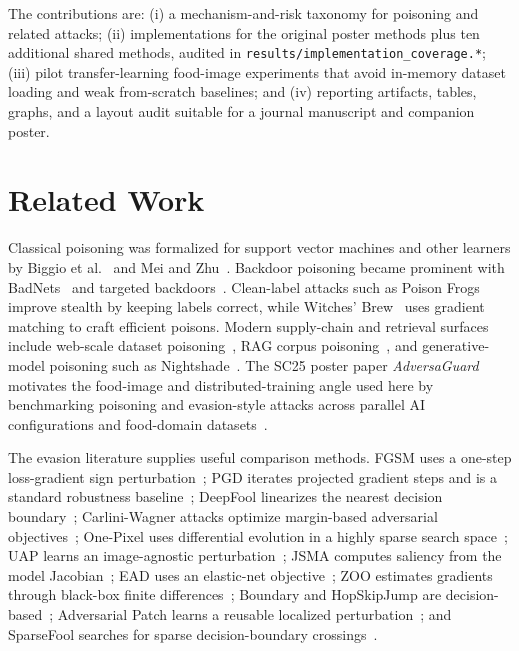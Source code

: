 ﻿\documentclass[6p,10pt,times]{ieeeaccess}
\begin{document}
The contributions are: (i) a mechanism-and-risk taxonomy for poisoning and related attacks; (ii) implementations for the original poster methods plus ten additional shared methods, audited in \texttt{results/implementation\_coverage.*}; (iii) pilot transfer-learning food-image experiments that avoid in-memory dataset loading and weak from-scratch baselines; and (iv) reporting artifacts, tables, graphs, and a layout audit suitable for a journal manuscript and companion poster.

\section{Related Work}

Classical poisoning was formalized for support vector machines and other learners by Biggio et al.~\cite{biggio2012} and Mei and Zhu~\cite{mei2015}. Backdoor poisoning became prominent with BadNets~\cite{badnets} and targeted backdoors~\cite{targetedbackdoor}. Clean-label attacks such as Poison Frogs~\cite{poisonfrogs} improve stealth by keeping labels correct, while Witches' Brew~\cite{witchesbrew} uses gradient matching to craft efficient poisons. Modern supply-chain and retrieval surfaces include web-scale dataset poisoning~\cite{webscale}, RAG corpus poisoning~\cite{poisonedrag}, and generative-model poisoning such as Nightshade~\cite{nightshade}. The SC25 poster paper \emph{AdversaGuard} motivates the food-image and distributed-training angle used here by benchmarking poisoning and evasion-style attacks across parallel AI configurations and food-domain datasets~\cite{adversaguard}.

The evasion literature supplies useful comparison methods. FGSM uses a one-step loss-gradient sign perturbation~\cite{goodfellow2014}; PGD iterates projected gradient steps and is a standard robustness baseline~\cite{madry2017}; DeepFool linearizes the nearest decision boundary~\cite{deepfool}; Carlini-Wagner attacks optimize margin-based adversarial objectives~\cite{cw}; One-Pixel uses differential evolution in a highly sparse search space~\cite{onepixel}; UAP learns an image-agnostic perturbation~\cite{uap}; JSMA computes saliency from the model Jacobian~\cite{jsma}; EAD uses an elastic-net objective~\cite{ead}; ZOO estimates gradients through black-box finite differences~\cite{zoo}; Boundary and HopSkipJump are decision-based~\cite{boundaryattack,hopskipjump}; Adversarial Patch learns a reusable localized perturbation~\cite{adversarialpatch}; and SparseFool searches for sparse decision-boundary crossings~\cite{sparsefool}.
\end{document}
